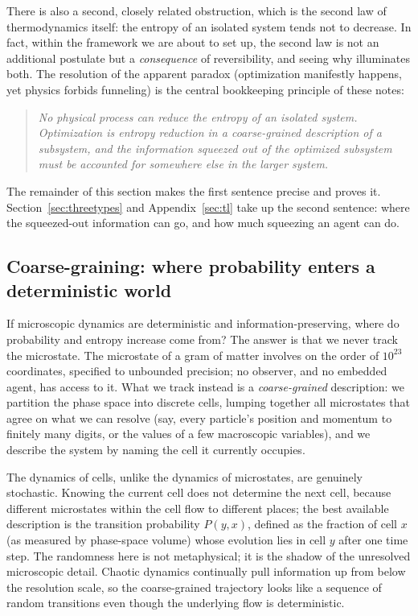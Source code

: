 \documentclass[10pt]{article}
\theoremstyle{definition}
\theoremstyle{remark}
\begin{document}
There is also a second, closely related obstruction, which is the second law of thermodynamics itself: the entropy of an isolated system tends not to decrease. In fact, within the framework we are about to set up, the second law is not an additional postulate but a \emph{consequence} of reversibility, and seeing why illuminates both. The resolution of the apparent paradox (optimization manifestly happens, yet physics forbids funneling) is the central bookkeeping principle of these notes:

\begin{quote}
\emph{No physical process can reduce the entropy of an isolated system. Optimization is entropy reduction in a coarse-grained description of a subsystem, and the information squeezed out of the optimized subsystem must be accounted for somewhere else in the larger system.}
\end{quote}

The remainder of this section makes the first sentence precise and proves it. Section~\ref{sec:threetypes} and Appendix~\ref{sec:tl} take up the second sentence: where the squeezed-out information can go, and how much squeezing an agent can do.

\subsection{Coarse-graining: where probability enters a deterministic world}
\label{sec:coarse}

If microscopic dynamics are deterministic and information-preserving, where do probability and entropy increase come from? The answer is that we never track the microstate. The microstate of a gram of matter involves on the order of $10^{23}$ coordinates, specified to unbounded precision; no observer, and no embedded agent, has access to it. What we track instead is a \emph{coarse-grained} description: we partition the phase space into discrete cells, lumping together all microstates that agree on what we can resolve (say, every particle's position and momentum to finitely many digits, or the values of a few macroscopic variables), and we describe the system by naming the cell it currently occupies.

The dynamics of cells, unlike the dynamics of microstates, are genuinely stochastic. Knowing the current cell does not determine the next cell, because different microstates within the cell flow to different places; the best available description is the transition probability $P(y, x)$, defined as the fraction of cell $x$ (as measured by phase-space volume) whose evolution lies in cell $y$ after one time step. The randomness here is not metaphysical; it is the shadow of the unresolved microscopic detail. Chaotic dynamics continually pull information up from below the resolution scale, so the coarse-grained trajectory looks like a sequence of random transitions even though the underlying flow is deterministic.
\end{document}
